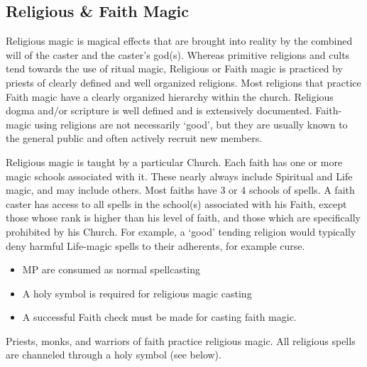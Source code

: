 \documentclass[twoside]{book}
\begin{document}
    

\subsection{Religious \& Faith Magic}
    
    {  
     Religious magic is magical effects that are brought
               into reality by the combined will of the caster and the
               caster's god(s). Whereas primitive religions and
               cults tend towards the use of ritual magic, Religious or
               Faith magic is practiced by priests of clearly defined and
               well organized religions. Most religions that practice
               Faith magic have a clearly organized hierarchy within the
               church. Religious dogma and/or scripture is well defined
               and is extensively documented. Faith-magic using religions
               are not necessarily `good', but they are
               usually known to the general public and often actively
               recruit new members. 
    }
  
    {  
     Religious magic is taught by a particular Church.
               Each faith has one or more magic schools associated with
               it. These nearly always include Spiritual and Life magic,
               and may include others. Most faiths have 3 or 4 schools of
               spells. A faith caster has access to all spells in the
               school(s) associated with his Faith, except those whose
               rank is higher than his level of faith, and those which
               are specifically prohibited by his Church. For example, a
               `good' tending religion would typically deny
               harmful Life-magic spells to their adherents, for example
               curse. 
    }
  
\begin{itemize}
      
  \item   MP are consumed as normal spellcasting 
  \item   A holy symbol is required for religious magic
                 casting 
  \item   A successful Faith check must be made for casting
                 faith magic. 
\end{itemize}
  
    {  
     Priests, monks, and warriors of faith practice
               religious magic. All religious spells are channeled
               through a holy symbol (see below). 
    }
  
\end{document}
